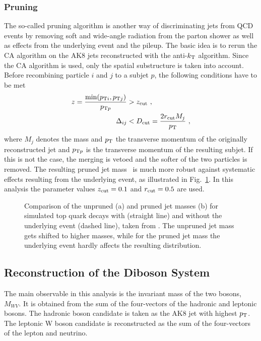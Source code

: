 \subsubsection*{Pruning}
The so-called pruning algorithm \cite{pruning} is another way of discriminating jets from QCD events by removing soft and wide-angle radiation from the parton shower as well as effects from the underlying event and the pileup. The basic idea is to rerun the CA algorithm on the AK8 jets reconstructed with the anti-$k_{\rm T}$ algorithm. Since the CA algorithm is used, only the spatial substructure is taken into account.  Before recombining particle $i$ and $j$ to a subjet $p$, the following conditions have to be met
\begin{align}
z = \frac{\min (p_{{\rm T}i},p_{{\rm T}j})}{p_{{\rm T}p}} &> z_{\rm cut} ~, \\
\Delta_{ij} &< D_{\rm cut} = \frac{2r_{\rm cut}M_j}{p_{\rm T}} ~,
\end{align}
where $M_j$ denotes the mass and $p_{\rm T}$ the transverse momentum of the originally reconstructed jet and $p_{{\rm T}p}$ is the transverse momentum of the resulting subjet. If this is not the case, the merging is vetoed and the softer of the two particles is removed. The resulting pruned jet mass \Mpr \ is much more robust against systematic effects resulting from the underlying event, as illustrated in Fig.~\ref{fig:reco:pruning}. In this analysis the parameter values $z_{\rm cut}=0.1$ and $r_{\rm cut}=0.5$ are used.
\begin{figure}
	\centering
	\caption[Comparison of the pruned and unpruned jet masses for simulated top quark decays with and without the underlying event]{Comparison of the unpruned (a) and pruned jet masses (b) for simulated top quark decays with (straight line) and without the underlying event (dashed line), taken from \cite{pruning}. The unpruned jet mass gets shifted to higher masses, while for the pruned jet mass the underlying event hardly affects the resulting distribution.}
	\label{fig:reco:pruning}
\end{figure}
\subsection{Reconstruction of the Diboson System}
The main observable in this analysis is the invariant mass of the two bosons, $M_{WV}$. It is obtained from the sum of the four-vectors of the hadronic and leptonic bosons. The hadronic boson candidate is taken as the AK8 jet with highest $p_{\rm T}$. The leptonic W boson candidate is reconstructed as the sum of the four-vectors of the lepton and neutrino. 


